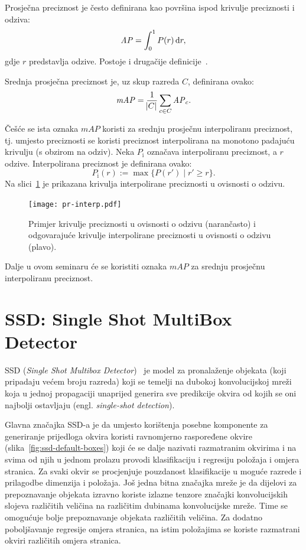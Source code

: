 \documentclass[utf8, seminar, numeric, lmodern]{feri}
\begin{document}
Prosječna preciznost je često definirana kao površina ispod krivulje preciznosti i odziva:
\begin{equation} \label{eq:AP}
\mathit{AP} = \int_{0}^{1} P(r) \dif r,
\end{equation}
gdje $r$ predstavlja odzive. Postoje i drugačije definicije~\cite{wiki-ir}.

Srednja prosječna preciznost je, uz skup razreda $C$, definirana ovako:
\begin{equation} \label{eq:mAP}
\mathit{mAP} = \frac{1}{\abs C}\sum_{c \in C} \mathit{AP}_c .
\end{equation}

Češće se ista oznaka $\mathit{mAP}$ koristi za srednju prosječnu interpoliranu preciznost, tj. umjesto preciznosti se koristi preciznost interpolirana na monotono padajuću krivulju (s obzirom na odziv). Neka $P_\mathrm{i}$ označava interpoliranu preciznost, a $r$ odzive. Interpolirana preciznost je definirana ovako:
\begin{equation} \label{eq:Pi}
P_\mathrm{i}(r) := \max\{P(r') \mid r' \geq r \}.
\end{equation}
Na slici~\ref{fig:pr-interp} je prikazana krivulja interpolirane preciznosti u ovisnosti o odzivu.

\begin{figure}[htbp] \centering
	\texttt{[image: pr-interp.pdf]}
	\caption{Primjer krivulje preciznosti u ovisnosti o odzivu (narančasto) i odgovarajuće krivulje interpolirane preciznosti u ovisnosti o odzivu (plavo).}
	\label{fig:pr-interp}
\end{figure}

Dalje u ovom seminaru će se koristiti oznaka $\mathit{mAP}$ za srednju prosječnu interpoliranu preciznost.



\chapter{SSD: Single Shot MultiBox Detector} \label{chap:ssd}

SSD (\emph{Single Shot Multibox Detector})~\cite{ssd} je model za pronalaženje objekata (koji pripadaju većem broju razreda) koji se temelji na dubokoj konvolucijskoj mreži koja u jednoj propagaciji unaprijed generira sve predikcije okvira od kojih se oni najbolji ostavljaju (engl. \emph{single-shot detection}). 

Glavna značajka SSD-a je da umjesto korištenja posebne komponente za generiranje prijedloga okvira koristi ravnomjerno raspoređene okvire (slika~\ref{fig:ssd-default-boxes}) koji će se dalje nazivati razmatranim okvirima i na svima od njih u jednom prolazu provodi klasifikaciju i regresiju položaja i omjera stranica. Za svaki okvir se procjenjuje pouzdanost klasifikacije u moguće razrede i prilagodbe dimenzija i položaja. Još jedna bitna značajka mreže je da dijelovi za prepoznavanje objekata izravno koriste izlazne tenzore značajki konvolucijskih slojeva različitih veličina na različitim dubinama konvolucijske mreže. Time se omogućuje bolje prepoznavanje objekata različitih veličina. Za dodatno poboljšavanje regresije omjera stranica, na istim položajima se koriste razmatrani okviri različitih omjera stranica.
\end{document}
